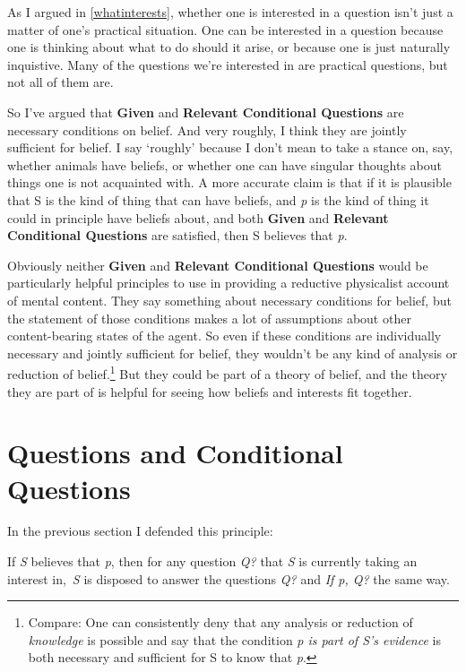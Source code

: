 \documentclass[
  11pt,
]{book}
\providecommand{\tightlist}{%
  \setlength{\itemsep}{0pt}\setlength{\parskip}{0pt}}
\begin{document}
As I argued in \ref{whatinterests}, whether one is interested in a question isn't just a matter of one's practical situation. One can be interested in a question because one is thinking about what to do should it arise, or because one is just naturally inquistive. Many of the questions we're interested in are practical questions, but not all of them are.

So I've argued that \textbf{Given} and \textbf{Relevant Conditional Questions} are necessary conditions on belief. And very roughly, I think they are jointly sufficient for belief. I say `roughly' because I don't mean to take a stance on, say, whether animals have beliefs, or whether one can have singular thoughts about things one is not acquainted with. A more accurate claim is that if it is plausible that S is the kind of thing that can have beliefs, and \emph{p} is the kind of thing it could in principle have beliefs about, and both \textbf{Given} and \textbf{Relevant Conditional Questions} are satisfied, then S believes that \emph{p}.

Obviously neither \textbf{Given} and \textbf{Relevant Conditional Questions} would be particularly helpful principles to use in providing a reductive physicalist account of mental content. They say something about necessary conditions for belief, but the statement of those conditions makes a lot of assumptions about other content-bearing states of the agent. So even if these conditions are individually necessary and jointly sufficient for belief, they wouldn't be any kind of analysis or reduction of belief.\footnote{Compare: One can consistently deny that any analysis or reduction of \emph{knowledge} is possible and say that the condition \emph{p is part of S's evidence} is both necessary and sufficient for S to know that \emph{p}.} But they could be part of a theory of belief, and the theory they are part of is helpful for seeing how beliefs and interests fit together.

\hypertarget{questions}{%
\section{Questions and Conditional Questions}\label{questions}}

In the previous section I defended this principle:

\begin{description}
\tightlist
\item[Relevant Conditional Questions]
If \emph{S} believes that \emph{p}, then for any question \emph{Q?} that \emph{S} is currently taking an interest in,~\emph{S} is disposed to answer the questions \emph{Q?} and \emph{If p, Q?} the same way.
\end{description}
\end{document}
